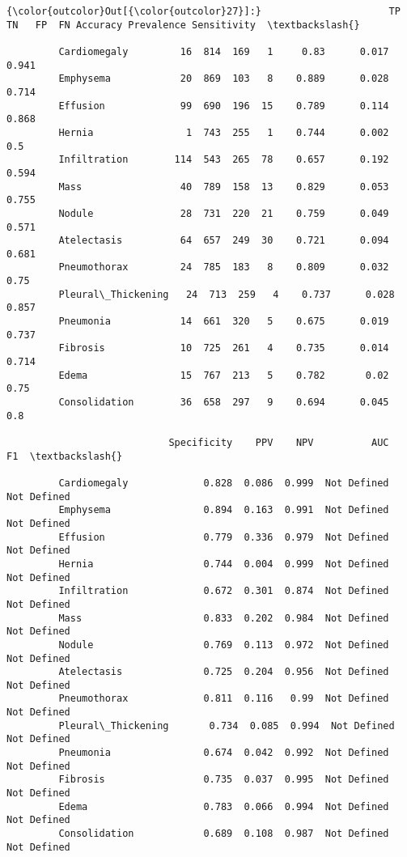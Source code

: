 \documentclass[11pt]{article}
\begin{document}
\begin{Verbatim}[commandchars=\\\{\}]
{\color{outcolor}Out[{\color{outcolor}27}]:}                      TP   TN   FP  FN Accuracy Prevalence Sensitivity  \textbackslash{}
                                                                                 
         Cardiomegaly         16  814  169   1     0.83      0.017       0.941   
         Emphysema            20  869  103   8    0.889      0.028       0.714   
         Effusion             99  690  196  15    0.789      0.114       0.868   
         Hernia                1  743  255   1    0.744      0.002         0.5   
         Infiltration        114  543  265  78    0.657      0.192       0.594   
         Mass                 40  789  158  13    0.829      0.053       0.755   
         Nodule               28  731  220  21    0.759      0.049       0.571   
         Atelectasis          64  657  249  30    0.721      0.094       0.681   
         Pneumothorax         24  785  183   8    0.809      0.032        0.75   
         Pleural\_Thickening   24  713  259   4    0.737      0.028       0.857   
         Pneumonia            14  661  320   5    0.675      0.019       0.737   
         Fibrosis             10  725  261   4    0.735      0.014       0.714   
         Edema                15  767  213   5    0.782       0.02        0.75   
         Consolidation        36  658  297   9    0.694      0.045         0.8   
         
                            Specificity    PPV    NPV          AUC           F1  \textbackslash{}
                                                                                  
         Cardiomegaly             0.828  0.086  0.999  Not Defined  Not Defined   
         Emphysema                0.894  0.163  0.991  Not Defined  Not Defined   
         Effusion                 0.779  0.336  0.979  Not Defined  Not Defined   
         Hernia                   0.744  0.004  0.999  Not Defined  Not Defined   
         Infiltration             0.672  0.301  0.874  Not Defined  Not Defined   
         Mass                     0.833  0.202  0.984  Not Defined  Not Defined   
         Nodule                   0.769  0.113  0.972  Not Defined  Not Defined   
         Atelectasis              0.725  0.204  0.956  Not Defined  Not Defined   
         Pneumothorax             0.811  0.116   0.99  Not Defined  Not Defined   
         Pleural\_Thickening       0.734  0.085  0.994  Not Defined  Not Defined   
         Pneumonia                0.674  0.042  0.992  Not Defined  Not Defined   
         Fibrosis                 0.735  0.037  0.995  Not Defined  Not Defined   
         Edema                    0.783  0.066  0.994  Not Defined  Not Defined   
         Consolidation            0.689  0.108  0.987  Not Defined  Not Defined   
         

\end{Verbatim}
\end{document}
